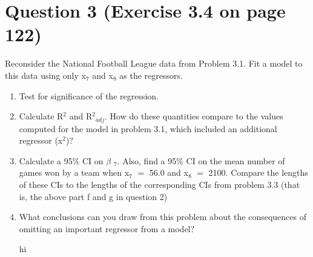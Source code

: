 \documentclass{article}
\newcommand{\mt}[1]{\ensuremath{#1}}
\newcommand\bsc[2][\DefaultOpt]{%
  \def\DefaultOpt{#2}%
  \section[#1]{#2}%
}
\newcommand{\balist}{\begin{enumerate}[label=\alph*.]}
\newcommand{\elist}{\end{enumerate}}
\newcommand{\bta}{\mt{\beta} }
\newcommand{\eql}{ \mt{\operatorname{=}} }
\newcommand{\uw}[2]{#1\mt{_{#2}}}
\newcommand{\uf}[2]{#1\mt{^{#2}}}
\begin{document}
\bsc{Question 3 (Exercise 3.4 on page 122)}{
Reconsider the National Football League data from Problem 3.1. Fit a model to this data using only \uw{x}{7} and \uw{x}{8} as the regressors.
\balist
\item Test for significance of the regression.
	
	
\item Calculate \uf{R}{2} and \uw{\uf{R}{2}}{adj}. How do these quantities compare to the values computed for the model in problem 3.1, which included an additional regressor (\uf{x}{2})?
	
	
\item Calculate a 95\% CI on \uw{\bta}{7}. Also, find a 95\% CI on the mean number of games won by a team when \uw{x}{7} \eql 56.0 and \uw{x}{8} \eql 2100. Compare the lengths of these CIs to the lengths of the corresponding CIs from problem 3.3 (that is, the above part f and g in question 2)
	
	
\item What conclusions can you draw from this problem about the consequences of omitting an important regressor from a model?
	
	hi
\elist
}
\end{document}
